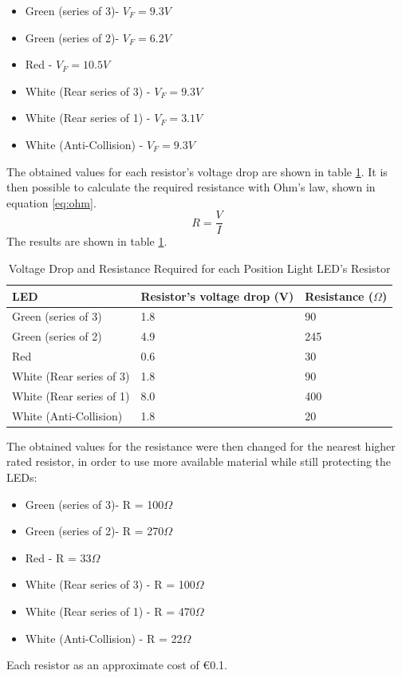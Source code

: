 \begin{itemize}
\item Green (series of 3)- $V_{F} = 9.3 V$
\item Green (series of 2)- $V_{F} = 6.2 V$
\item Red - $V_{F} = 10.5 V$
\item White (Rear series of 3) - $V_{F} = 9.3 V$
\item White (Rear series of 1) - $V_{F} = 3.1 V$
\item White (Anti-Collision) - $V_{F} = 9.3 V$
\end{itemize}
The obtained values for each resistor's voltage drop are shown in table \ref{tab:voltageresistance}. It is then possible to calculate the required resistance with Ohm's law, shown in equation \eqref{eq:ohm}.
\begin{equation}\label{eq:ohm}
R=\dfrac{V}{I}
\end{equation}
The results are shown in table \ref{tab:voltageresistance}.
\begin{table}[!htb]
\centering
\caption[Voltage Drop and Resistance Required for each Position Light LED's Resistor]{Voltage Drop and Resistance Required for each Position Light LED's Resistor}
\label{tab:voltageresistance}
\begin{tabular}{@{}lll@{}}
\toprule
LED                    		& Resistor's voltage drop (V) 	& Resistance ($\Omega$) \\ \midrule
Green (series of 3)    		& 1.8							& 90                   \\
Green (series of 2)    		& 4.9							& 245                   \\
Red                    		& 0.6							& 30                   \\
White (Rear series of 3)    & 1.8							& 90                    \\
White (Rear series of 1)    & 8.0							& 400                   \\
White (Anti-Collision) 		& 1.8							& 20                    \\ \bottomrule
\end{tabular}
\end{table}

The obtained values for the resistance were then changed for the nearest higher rated resistor, in order to use more available material while still protecting the LEDs:
\begin{itemize}
\item Green (series of 3)- R = 100$\Omega$
\item Green (series of 2)- R = 270$\Omega$
\item Red - R = 33$\Omega$
\item White (Rear series of 3) - R = 100$\Omega$
\item White (Rear series of 1) - R = 470$\Omega$
\item White (Anti-Collision) - R = 22$\Omega$
\end{itemize}
Each resistor as an approximate cost of \euro{0.1}.\\

